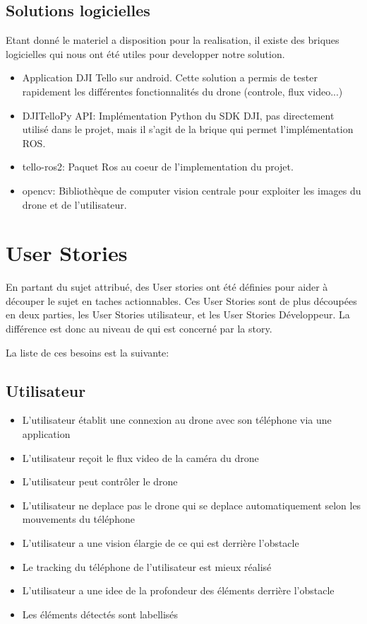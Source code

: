 \documentclass{article}
\begin{document}
\subsection{Solutions logicielles}

Etant donné le materiel a disposition pour la realisation, il existe des briques logicielles qui nous ont \'et\'e utiles pour developper notre solution.
\begin{itemize}
    \item Application DJI Tello sur android\cite{telloapp}. Cette solution a permis de tester rapidement les différentes fonctionnalités du drone (controle, flux video...)
    \item DJITelloPy API\cite{djitellopy}: Implémentation Python du SDK DJI\cite{tellosdk}, pas directement utilisé dans le projet, mais il s'agit de la brique qui permet l'implémentation ROS.
    \item tello-ros2\cite{telloros}: Paquet Ros au coeur de l'implementation du projet.
    \item opencv\cite{opencv}: Bibliothèque de computer vision centrale pour exploiter les images du drone et de l'utilisateur.
\end{itemize}


\section{User Stories}

En partant du sujet attribu\'e, des User stories ont \'et\'e d\'efinies pour
aider \`a
d\'ecouper le sujet en taches actionnables. Ces User Stories sont de plus d\'ecoup\'ees en deux parties, les User Stories utilisateur, et les User Stories
Développeur. La différence est donc au niveau de qui est concern\'e par la story.

La liste de ces besoins est la suivante:

\subsection{Utilisateur}
\begin{itemize}
    \item L'utilisateur établit une connexion au drone avec son téléphone via une application
    \item L'utilisateur reçoit le flux video de la caméra du drone
    \item L'utilisateur peut contrôler le drone
    \item L'utilisateur ne deplace pas le drone qui se deplace automatiquement selon les mouvements du téléphone
    \item L'utilisateur a une vision élargie de ce qui est derrière l'obstacle
    \item Le tracking du téléphone de l'utilisateur est mieux réalisé
    \item L'utilisateur a une idee de la profondeur des éléments derrière l'obstacle
    \item Les éléments détectés sont labellisés 
\end{itemize}
\end{document}
